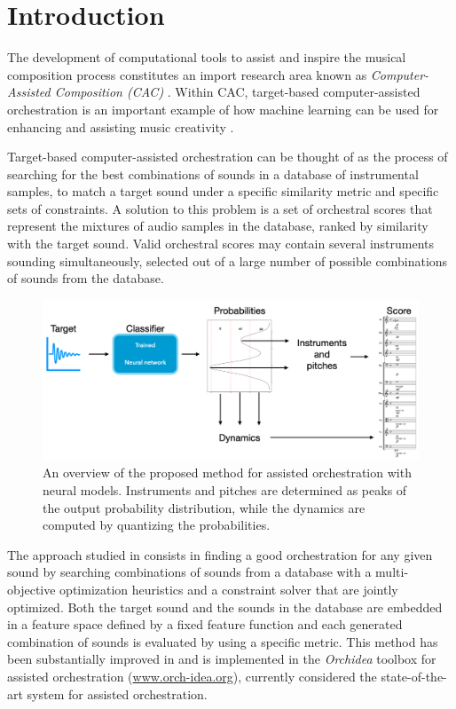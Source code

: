 \documentclass[runningheads,a4paper]{llncs}
\begin{document}
\section{Introduction}\label{sec:introduction}

The development of computational tools to assist and inspire the musical composition process constitutes an import research area known as \emph{Computer-Assisted Composition (CAC)} \cite{FerVic2013, Ari2005}. Within CAC, target-based computer-assisted orchestration is an important example of how machine learning can be used for {enhancing} and {assisting} music creativity \cite{Maresz2003}. 

Target-based computer-assisted orchestration can be thought of as the process of searching for the best combinations of sounds in a database of instrumental samples, to match a target sound under a specific similarity metric and specific sets of constraints. A solution to this problem is a set of orchestral scores that represent the mixtures of audio samples in the database, ranked by similarity with the target sound. 
Valid orchestral scores may contain several instruments sounding simultaneously, selected out of a large number of possible combinations of sounds from the database.

\begin{figure}
	\centering
	\includegraphics[scale=0.17]{../latex/figs/method.png}
	\caption{An overview of the proposed method for assisted orchestration with neural models. Instruments and pitches are determined as peaks of the output probability distribution, while the dynamics are computed by quantizing the probabilities. \label{fig:method}}
\end{figure}

The approach studied in \cite{Carpentier2010} consists in finding a good orchestration for any given sound by searching combinations of sounds from a database with a multi-objective optimization heuristics and a constraint solver that are jointly optimized. Both the target sound and the sounds in the database are embedded in a feature space defined by a fixed feature function and each generated combination of sounds is evaluated by using a specific metric. This method has been substantially improved in \cite{Cella18, Cella2020} and is implemented in the \emph{Orchidea} toolbox for assisted orchestration (\url{www.orch-idea.org}), currently considered the state-of-the-art system for assisted orchestration.
\end{document}
